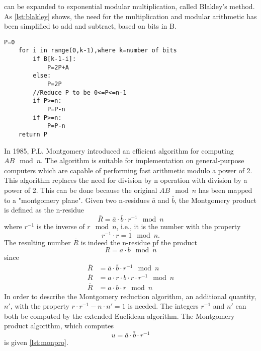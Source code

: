 %
 can be expanded to exponential modular multiplication, called Blakley's method. As \cref{lst:blakley} shows, the need for the multiplication and modular arithmetic has been simplified to add and subtract, based on bits in B.
%
\begin{lstlisting}[label=lst:blakley, caption=Blakely's method]
    P=0
    for i in range(0,k-1),where k=number of bits
        if B[k-1-i]:
            P=2P+A
        else:
            P=2P
        //Reduce P to be 0<=P<=n-1
        if P>=n:
            P=P-n
        if P>=n:
            P=P-n
    return P
\end{lstlisting}
%
In 1985, P.L. Montgomery introduced an efficient algorithm for computing $AB\mod{n}$. The algorithm is suitable for implementation on general-purpose computers which are capable of performing fast arithmetic modulo a power of 2. This algorithm replaces the need for division by n operation with division by a power of 2. This can be done because the original $AB\mod{n}$ has been mapped to a "montgomery plane". Given two n-residues $\bar{a}$ and $\bar{b}$, the Montgomery product is defined as the n-residue
%
\begin{equation}
    \bar{R}=\bar{a} \cdot \bar{b} \cdot r^{-1} \mod{n}
\end{equation}
%
where $r^{-1}$ is the inverse of $r\mod{n}$, i.e., it is the number with the property
%
\begin{equation}
    r^{-1} \cdot r=1\mod{n}.
\end{equation}
%
The resulting number $\bar{R}$ is indeed the n-residue pf the product
%
\begin{equation}
    R=a \cdot b\mod{n}   
\end{equation}
%
since
%
\begin{align}
    \bar{R} &=\bar{a} \cdot \bar{b} \cdot r^{-1} \mod{n}\\
    \bar{R} &=a\cdot r \cdot b \cdot r \cdot r^{-1} \mod{n}\\
    \bar{R} &=a\cdot b \cdot r \mod{n}
\end{align}
%
In order to describe the Montgomery reduction algorithm, an additional quantity, $n'$, with the property $r \cdot r^{-1} -n \cdot n' =1$ is needed. The integers $r^{-1}$ and $n'$ can both be computed by the extended Euclidean algorithm. The Montgomery product algorithm, which computes
\begin{equation}
    u=\bar{a} \cdot \bar{b} \cdot r^{-1}
\end{equation}
is given \cref{lst:monpro}.
